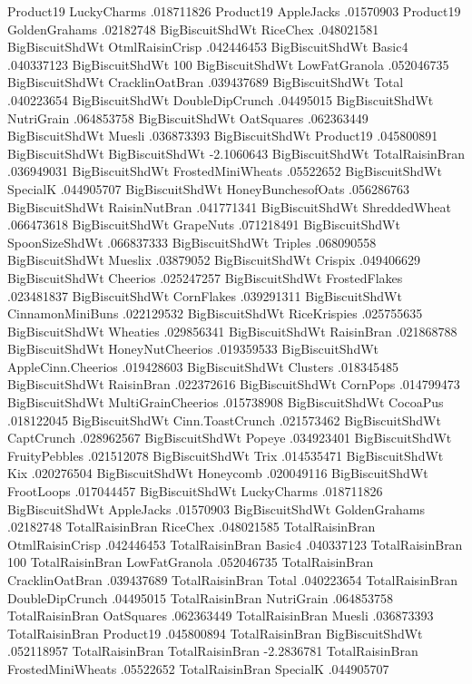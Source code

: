 Product19	LuckyCharms	.018711826
Product19	AppleJacks	.01570903
Product19	GoldenGrahams	.02182748
BigBiscuitShdWt	RiceChex	.048021581
BigBiscuitShdWt	OtmlRaisinCrisp	.042446453
BigBiscuitShdWt	Basic4	.040337123
BigBiscuitShdWt	100%
BigBiscuitShdWt	LowFatGranola	.052046735
BigBiscuitShdWt	CracklinOatBran	.039437689
BigBiscuitShdWt	Total	.040223654
BigBiscuitShdWt	DoubleDipCrunch	.04495015
BigBiscuitShdWt	NutriGrain	.064853758
BigBiscuitShdWt	OatSquares	.062363449
BigBiscuitShdWt	Muesli	.036873393
BigBiscuitShdWt	Product19	.045800891
BigBiscuitShdWt	BigBiscuitShdWt	-2.1060643
BigBiscuitShdWt	TotalRaisinBran	.036949031
BigBiscuitShdWt	FrostedMiniWheats	.05522652
BigBiscuitShdWt	SpecialK	.044905707
BigBiscuitShdWt	HoneyBunchesofOats	.056286763
BigBiscuitShdWt	RaisinNutBran	.041771341
BigBiscuitShdWt	ShreddedWheat	.066473618
BigBiscuitShdWt	GrapeNuts	.071218491
BigBiscuitShdWt	SpoonSizeShdWt	.066837333
BigBiscuitShdWt	Triples	.068090558
BigBiscuitShdWt	Mueslix	.03879052
BigBiscuitShdWt	Crispix	.049406629
BigBiscuitShdWt	Cheerios	.025247257
BigBiscuitShdWt	FrostedFlakes	.023481837
BigBiscuitShdWt	CornFlakes	.039291311
BigBiscuitShdWt	CinnamonMiniBuns	.022129532
BigBiscuitShdWt	RiceKrispies	.025755635
BigBiscuitShdWt	Wheaties	.029856341
BigBiscuitShdWt	RaisinBran	.021868788
BigBiscuitShdWt	HoneyNutCheerios	.019359533
BigBiscuitShdWt	AppleCinn.Cheerios	.019428603
BigBiscuitShdWt	Clusters	.018345485
BigBiscuitShdWt	RaisinBran	.022372616
BigBiscuitShdWt	CornPops	.014799473
BigBiscuitShdWt	MultiGrainCheerios	.015738908
BigBiscuitShdWt	CocoaPus	.018122045
BigBiscuitShdWt	Cinn.ToastCrunch	.021573462
BigBiscuitShdWt	CaptCrunch	.028962567
BigBiscuitShdWt	Popeye	.034923401
BigBiscuitShdWt	FruityPebbles	.021512078
BigBiscuitShdWt	Trix	.014535471
BigBiscuitShdWt	Kix	.020276504
BigBiscuitShdWt	Honeycomb	.020049116
BigBiscuitShdWt	FrootLoops	.017044457
BigBiscuitShdWt	LuckyCharms	.018711826
BigBiscuitShdWt	AppleJacks	.01570903
BigBiscuitShdWt	GoldenGrahams	.02182748
TotalRaisinBran	RiceChex	.048021585
TotalRaisinBran	OtmlRaisinCrisp	.042446453
TotalRaisinBran	Basic4	.040337123
TotalRaisinBran	100%
TotalRaisinBran	LowFatGranola	.052046735
TotalRaisinBran	CracklinOatBran	.039437689
TotalRaisinBran	Total	.040223654
TotalRaisinBran	DoubleDipCrunch	.04495015
TotalRaisinBran	NutriGrain	.064853758
TotalRaisinBran	OatSquares	.062363449
TotalRaisinBran	Muesli	.036873393
TotalRaisinBran	Product19	.045800894
TotalRaisinBran	BigBiscuitShdWt	.052118957
TotalRaisinBran	TotalRaisinBran	-2.2836781
TotalRaisinBran	FrostedMiniWheats	.05522652
TotalRaisinBran	SpecialK	.044905707
